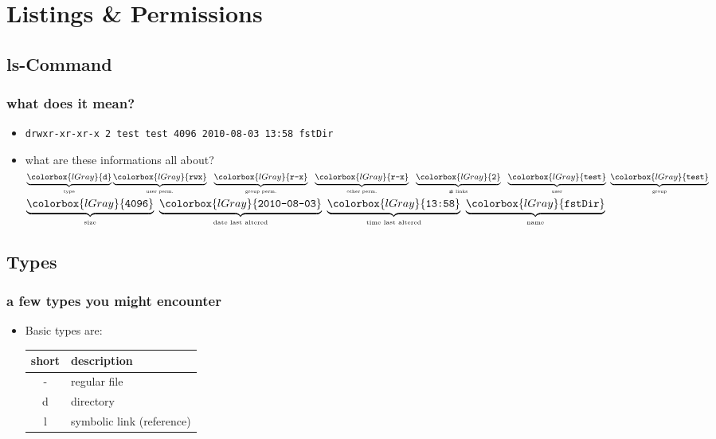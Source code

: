 \documentclass[hyperref={pdfpagelabels=false}]{beamer}
\newcommand{\code}[1]{\colorbox{lGray}{\texttt{#1}}}
\begin{document}
\section{Listings \& Permissions}
    \subsection{ls-Command}
       \begin{frame}[fragile]
			\frametitle{what does it mean?}
			\begin{itemize}
                \item<1-> \code{drwxr-xr-xr-x 2 test test 4096 2010-08-03 13:58 fstDir}
				\item<2-> what are these informations all about?\\
                $\underbrace{\code{d}}_{\text{\tiny{type}}}
                \underbrace{\code{rwx}}_{\text{\tiny{user perm.}}}\ \ 
                \underbrace{\code{r-x}}_{\text{\tiny{group perm.}}}\ \ 
                \underbrace{\code{r-x}}_{\text{\tiny{other perm.}}}\ \
                \underbrace{\code{2}}_{\text{\tiny{\# links}}}\ \ 
                \underbrace{\code{test}}_{\text{\tiny{user}}}\ 
                \underbrace{\code{test}}_{\text{\tiny{group}}}$ \\
                $\underbrace{\code{4096}}_{\text{\tiny{size}}}\ 
                \underbrace{\code{2010-08-03}}_{\text{\tiny{date last altered}}}\ 
                \underbrace{\code{13:58}}_{\text{\tiny{time last altered}}}\ 
                \underbrace{\code{fstDir}}_{\text{\tiny{name}}}$
            \end{itemize}
		\end{frame}
    \subsection{Types}
        \begin{frame}
			\frametitle{a few types you might encounter}
			\begin{itemize}
                \item<1-> Basic types are: \\
                \begin{tabular}{cl}
                    short & description \\ \hline
                    - & regular file \\
                    d & directory \\
                    l & symbolic link (reference)
                \end{tabular}
            \end{itemize}
		\end{frame}
\end{document}
